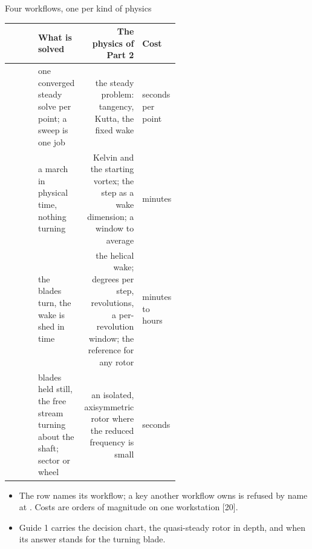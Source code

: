 \begin{frame}{Four workflows, one per kind of physics}
\relax
{\ftstablesize\renewcommand{\arraystretch}{1.10}
\begin{tabularx}{\linewidth}{@{}P{0.17\linewidth}P{0.27\linewidth}RP{0.12\linewidth}@{}}
\toprule
\textbf{} & \textbf{What is solved} & \textbf{The physics of Part 2} & \textbf{Cost} \\
\midrule
{} & one converged steady solve per point; a sweep is one job &
  the steady problem: tangency, Kutta, the fixed wake & seconds per point \\
 & a march in physical time, nothing turning & Kelvin and
  the starting vortex; the step as a wake dimension; a window to average &
  minutes \\
 & the blades turn, the wake is shed in time & the
  helical wake; degrees per step, revolutions, a per-revolution window; the
  reference for any rotor & minutes to hours \\
 & blades held still, the free stream turning about the
  shaft; sector or wheel & an isolated, axisymmetric rotor where the reduced
  frequency is small & seconds \\
\bottomrule
\end{tabularx}}
\vspace{1mm}
\begin{itemize}\small
  \item The row names its workflow; a key another workflow owns is refused by
        name at . Costs are orders of magnitude on one
        workstation [20].
  \item Guide 1 carries the decision chart, the quasi-steady rotor in depth,
        and when its answer stands for the turning blade.
\end{itemize}
\end{frame}

